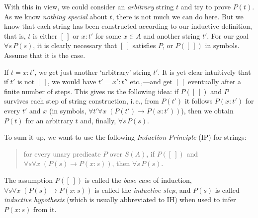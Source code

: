 \documentclass[12pt,notitlepage]{article}
\theoremstyle{plain}
\theoremstyle{definition}
\theoremstyle{plain}
\newcommand{\1}{\mathbf{1}}
\newcommand{\0}{\mathbf{0}}
\begin{document}
With this in view, we could consider an \emph{arbitrary} string $t$ and try to prove $P(t)$. As we know \emph{nothing special} about $t$, there is not much we can do here. But we know that each string has been constructed according to our inductive definition, that is, $t$ is either $[\ ]$ or $x : t'$ for some $x \in A$ and another string $t'$. For our goal $\forall s\, P(s)$, it is clearly necessary that $[\ ]$ satisfies $P$, or $P([\ ])$ in symbols. Assume that it is the case.

If $t = x : t'$, we get just another `arbitrary' string $t'$. It is yet clear intuitively that if $t'$ is not $[\ ]$, we would have  $t' = x' : t''$ etc.,---and get $[\ ]$ eventually after a finite number of steps. This gives us the following idea: if $P([\ ])$ and $P$ survives each step of string construction, i.\,e., from $P(t')$ it follows $P(x : t')$ for every $t'$ and $x$ (in symbols, $\forall t' \forall x\; (P(t') \to P(x:t'))$), then we obtain $P( t )$ for an arbitrary $t$ and, finally, $\forall s\, P(s)$.

To sum it up, we want to use the following \emph{Induction Principle} (IP) for strings:
\begin{quote}
	for every unary predicate $P$ over $S(A)$, if $P([\ ])$ and  $\forall s \forall x\; (P(s) \to P(x:s))$, then $\forall s\, P(s)$.
\end{quote}
The assumption $P([\ ])$ is called the \emph{base case} of induction, $\forall s \forall x\; (P(s) \to P(x:s))$ is called the \emph{inductive step}, and $P(s)$ is called \emph{inductive hypothesis} (which is usually abbreviated to IH) when used to infer $P(x:s)$ from it.
\end{document}
